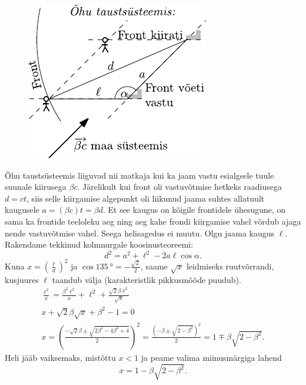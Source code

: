 \documentclass[11pt]{article}
\begin{document}
{{\begin{figure}
	\vspace{-10pt}
	\begin{center}
		\includegraphics[width = 0.9\linewidth]{2009-lahg-10-lah}
	\end{center}
\end{figure}

Õhu taustsüsteemis liiguvad nii matkaja kui ka jaam vastu esialgsele tuule suunale kiirusega $\beta c$. Järelikult kui front oli vastuvõtmise hetkeks raadiusega $d = ct$, siis selle kiirgamise algepunkt oli liikunud jaama suhtes allatuult kaugusele $a = (\beta c)t = \beta d$. Et see kaugus on kõigile frontidele ühesugune, on sama ka frontide teeloleku aeg ning aeg kahe frondi kiirgamise vahel võrdub ajaga nende vastuvõtmise vahel. Seega helisagedus ei muutu. Olgu jaama kaugus $\ell$. Rakendame tekkinud kolmnurgale koosinusteoreemi:
\[
d^{2}=a^{2}+\ell^{2}-2 a \ell \cos \alpha.
\]
Kuna $x = \left(\frac{\ell}{d}\right)^2$ ja $\cos \SI{135}{\degree}=-\frac{\sqrt{2}}{2}$, saame $\sqrt x$ leidmiseks ruutvõrrandi, kusjuures $\ell$ taandub välja (karakteristlik pikkusmõõde puudub).
\[
\begin{array}{c}{\frac{\ell^{2}}{x}=\frac{\beta^{2} \ell^{2}}{x}+\ell^{2}+\frac{\sqrt{2} \beta \ell^{2}}{\sqrt{x}}} \\ {x+\sqrt{2} \beta \sqrt{x}+\beta^{2}-1=0} \\ {x=\left(\frac{-\sqrt{2} \beta \pm \sqrt{2 \beta^{2}-4 \beta^{2}+4}}{2}\right)^{2}=\frac{\left(-\beta \pm \sqrt{2-\beta^{2}}\right)^{2}}{2}=1 \mp \beta \sqrt{2-\beta^{2}}.}\end{array}
\]
Heli jääb vaiksemaks, mistõttu $x < 1$ ja peame valima miinusmärgiga lahend
\[
x=1-\beta \sqrt{2-\beta^{2}}.
\]
\fi
}

}
\end{document}
